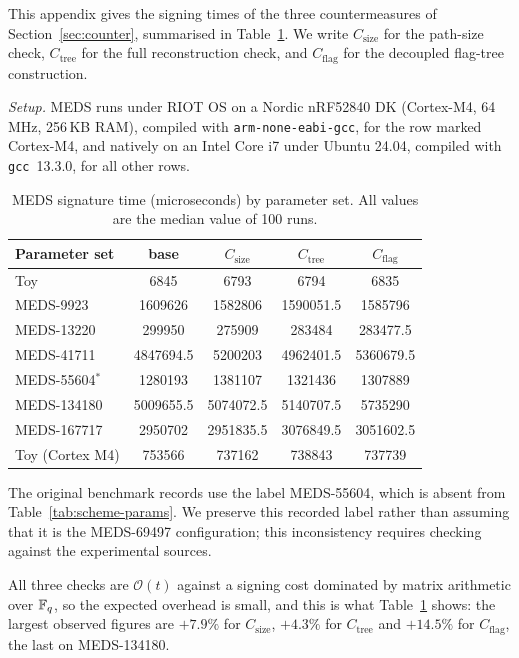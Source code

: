 This appendix gives the signing times of the three countermeasures of
Section~\ref{sec:counter}, summarised in Table~\ref{tab:counter_1_cmp}. We write
$C_{\mathrm{size}}$ for the path-size check, $C_{\mathrm{tree}}$ for the full
reconstruction check, and $C_{\mathrm{flag}}$ for the decoupled flag-tree
construction.

\noindent\textit{Setup.} MEDS runs under RIOT OS on a Nordic nRF52840 DK
(Cortex-M4, 64\,MHz, 256\,KB RAM), compiled with \texttt{arm-none-eabi-gcc},
for the row marked Cortex-M4, and natively on an Intel Core i7 under Ubuntu
24.04, compiled with \texttt{gcc}~13.3.0, for all other rows.

\begin{table}[htbp]
\centering
\caption{MEDS signature time (microseconds) by parameter set. All values are the median value of 100 runs.}
\label{tab:counter_1_cmp}
\smallskip
\begin{tabular*}{\textwidth}{l@{\extracolsep{\fill}}cccc}
\toprule
\textbf{Parameter set} & \textbf{base} & $C_{\mathrm{size}}$ & $C_{\mathrm{tree}}$ & $C_{\mathrm{flag}}$ \\
\midrule
Toy                    & 6845    & 6793      & 6794      & 6835          \\
MEDS-9923               & 1609626	& 1582806	& 1590051.5	& 1585796 \\
MEDS-13220              & 299950	& 275909	& 283484	& 283477.5         \\
MEDS-41711              & 4847694.5	& 5200203	& 4962401.5	& 5360679.5 \\
MEDS-55604$^{*}$        & 1280193	& 1381107	& 1321436	& 1307889          \\
MEDS-134180             & 5009655.5	& 5074072.5	& 5140707.5	& 5735290 \\
MEDS-167717             & 2950702	& 2951835.5	& 3076849.5	& 3051602.5  \\
\midrule
Toy (Cortex M4)        & 753566	& 737162	& 738843	& 737739
\\
\bottomrule
\end{tabular*}
\end{table}

The original benchmark records use the label MEDS-55604, which is absent
from Table~\ref{tab:scheme-params}. We preserve this recorded label rather
than assuming that it is the MEDS-69497 configuration; this inconsistency
requires checking against the experimental sources.

All three checks are $\mathcal{O}(t)$ against a signing cost dominated by
matrix arithmetic over $\mathbb{F}_q$, so the expected overhead is small, and this is
what Table~\ref{tab:counter_1_cmp} shows: the largest observed figures are
$+7.9\%$ for $C_{\mathrm{size}}$, $+4.3\%$ for $C_{\mathrm{tree}}$ and
$+14.5\%$ for $C_{\mathrm{flag}}$, the last on MEDS-134180.

